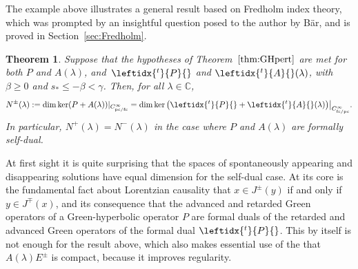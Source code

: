 \documentclass[pdftex]{sigma}
\numberwithin{equation}{section}
\newtheorem{Theorem}{Theorem}[section]
\newcommand{\CC}{{\mathbb C}}
\newcommand{\fc}{\mathrm{fc}}
\newcommand{\pc}{\mathrm{pc}}
\newcommand{\adj}[1]{\leftidx{^{t}}{#1}{}}
\begin{document}
 The example above illustrates a general result based on Fredholm index theory, which was prompted by an insightful
 question posed to the author by B\"ar, and is proved in Section~\ref{sec:Fredholm}.
 \begin{Theorem}\label{thm:Fredholm}
 	Suppose that the hypotheses of Theorem~$\ref{thm:GHpert}$ are met for both $P$ and $A(\lambda)$, and~$\adj{P}$ and $\adj{A}(\lambda)$, with $\beta\ge 0$ and $s_*\le -\beta<\gamma$.
 	Then, for all $\lambda\in\CC$,
 	\begin{equation*}
 		N^\pm(\lambda) := \dim\ker (P+A(\lambda))|_{C^\infty_{\pc/\fc}} = \dim\ker \big(\adj{P}+\adj{A}(\lambda)\big)\big|_{C^\infty_{\fc/\pc}} .
 	\end{equation*}
 	In particular, $N^+(\lambda)=N^-(\lambda)$ in the case where $P$ and $A(\lambda)$ are formally self-dual.
 \end{Theorem}
 At first sight it is quite surprising that the spaces of spontaneously appearing and disappearing solutions have equal dimension for the self-dual case. At its core is the fundamental fact about
 Lorentzian causality that $x\in J^\pm(y)$ if and only if $y\in J^\mp(x)$, and its consequence that
 the advanced and retarded Green operators of a Green-hyperbolic operator $P$ are formal duals of the retarded and advanced Green operators of the formal dual $\adj{P}$. This by itself is not enough for the result above, which also makes essential use of the that $A(\lambda)E^\pm$ is compact, because it improves regularity.
\end{document}

